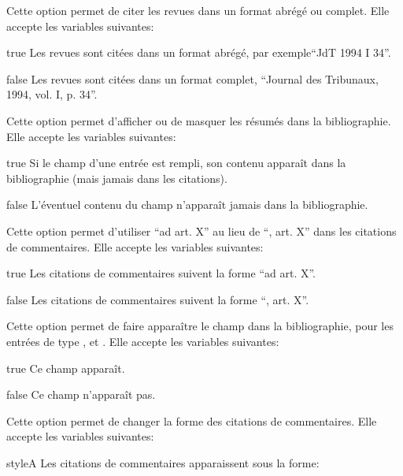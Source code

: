 \documentclass[a4paper]{ltxdockit}[2011/03/25]
\newcommand{\GM}{\enquote}
\newcommand{\pex}{\textnormal{par exemple}\xspace}
\begin{document}
\begin{optionlist}

\label{abrjournal}
Cette option permet de citer les revues dans un format abrégé ou complet. Elle accepte les variables suivantes:
\begin{valuelist}
\item[true] Les revues sont citées dans un format abrégé, \pex \GM{JdT 1994 I 34}.
\item[false] Les revues sont citées dans un format complet, \GM{Journal des Tribunaux, 1994, vol. I, p. 34}.
\end{valuelist}

\bigskip
{}\label{abstracts}
Cette option permet d'afficher ou de masquer les résumés dans la bibliographie. Elle accepte les variables suivantes:
\begin{valuelist}
\item[true] Si le champ  d'une entrée est rempli, son contenu apparaît dans la bibliographie (mais jamais dans les citations).
\item[false] L'éventuel contenu du champ  n'apparaît jamais dans la bibliographie.
\end{valuelist}

\bigskip
{}\label{adarticle}
Cette option permet d'utiliser \GM{ad art. X} au lieu de \GM{, art. X} dans les citations de commentaires. Elle accepte les variables suivantes:
\begin{valuelist}
\item[true] Les citations de commentaires suivent la forme \GM{ad art. X}.
\item[false] Les citations de commentaires suivent la forme \GM{, art. X}.
\end{valuelist}

\bigskip
{}\label{bookspages}
Cette option permet de faire apparaître le champ  dans la bibliographie, pour les entrées de type ,  et . Elle accepte les variables suivantes:
\begin{valuelist}
\item[true] Ce champ apparaît.
\item[false] Ce champ n'apparaît pas.
\end{valuelist}

\bigskip
{}\label{commentarystyle}
Cette option permet de changer la forme des citations de commentaires. Elle accepte les variables suivantes:
\begin{valuelist}
\item[styleA] Les citations de commentaires apparaissent sous la forme:


\end{valuelist}
\end{optionlist}
\end{document}
